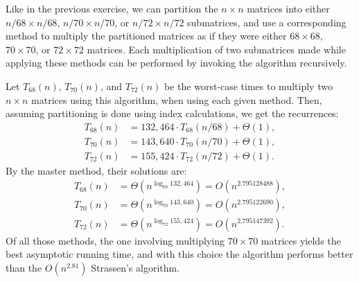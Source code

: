 Like in the previous exercise, we can partition the $n\times n$ matrices into either $n/68\times n/68$, $n/70\times n/70$, or $n/72\times n/72$ submatrices, and use a corresponding method to multiply the partitioned matrices as if they were either $68\times68$, $70\times70$, or $72\times72$ matrices.
Each multiplication of two submatrices made while applying these methods can be performed by invoking the algorithm recursively.

Let $T_{68}(n)$, $T_{70}(n)$, and $T_{72}(n)$ be the worst-case times to multiply two $n\times n$ matrices using this algorithm, when using each given method.
Then, assuming partitioning is done using index calculations, we get the recurrences:
\begin{align*}
    T_{68}(n) &= 132{,}464\cdot T_{68}(n/68)+\Theta(1), \\
    T_{70}(n) &= 143{,}640\cdot T_{70}(n/70)+\Theta(1), \\
    T_{72}(n) &= 155{,}424\cdot T_{72}(n/72)+\Theta(1).
\end{align*}
By the master method, their solutions are:
\begin{align*}
    T_{68}(n) &= \Theta(n^{\log_{68}132{,}464}) = O(n^{2.795128488}), \\
    T_{70}(n) &= \Theta(n^{\log_{70}143{,}640}) = O(n^{2.795122690}), \\
    T_{72}(n) &= \Theta(n^{\log_{72}155{,}424}) = O(n^{2.795147392}).
\end{align*}
Of all those methods, the one involving multiplying $70\times70$ matrices yields the best asymptotic running time, and with this choice the algorithm performs better than the $O(n^{2.81})$ Strassen's algorithm.
